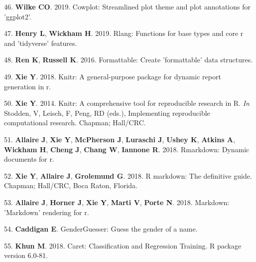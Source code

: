 \documentclass[11pt,]{article}
\begin{document}
\hypertarget{ref-cowplot}{}
46. \textbf{Wilke CO}. 2019. Cowplot: Streamlined plot theme and plot
annotations for 'ggplot2'.

\hypertarget{ref-rlang}{}
47. \textbf{Henry L}, \textbf{Wickham H}. 2019. Rlang: Functions for
base types and core r and 'tidyverse' features.

\hypertarget{ref-formattable}{}
48. \textbf{Ren K}, \textbf{Russell K}. 2016. Formattable: Create
'formattable' data structures.

\hypertarget{ref-knitr_2018}{}
49. \textbf{Xie Y}. 2018. Knitr: A general-purpose package for dynamic
report generation in r.

\hypertarget{ref-knitr_2014}{}
50. \textbf{Xie Y}. 2014. Knitr: A comprehensive tool for reproducible
research in R. \emph{In} Stodden, V, Leisch, F, Peng, RD (eds.),
Implementing reproducible computational research. Chapman; Hall/CRC.

\hypertarget{ref-rmd_rstudio}{}
51. \textbf{Allaire J}, \textbf{Xie Y}, \textbf{McPherson J},
\textbf{Luraschi J}, \textbf{Ushey K}, \textbf{Atkins A},
\textbf{Wickham H}, \textbf{Cheng J}, \textbf{Chang W}, \textbf{Iannone
R}. 2018. Rmarkdown: Dynamic documents for r.

\hypertarget{ref-rmd_book}{}
52. \textbf{Xie Y}, \textbf{Allaire J}, \textbf{Grolemund G}. 2018. R
markdown: The definitive guide. Chapman; Hall/CRC, Boca Raton, Florida.

\hypertarget{ref-markdown}{}
53. \textbf{Allaire J}, \textbf{Horner J}, \textbf{Xie Y}, \textbf{Marti
V}, \textbf{Porte N}. 2018. Markdown: 'Markdown' rendering for r.

\hypertarget{ref-caddigan_genderguesser}{}
54. \textbf{Caddigan E}. GenderGuesser: Guess the gender of a name.

\hypertarget{ref-khun_caret_2018}{}
55. \textbf{Khun M}. 2018. Caret: Classification and Regression
Training. R package version 6.0-81.
\end{document}
